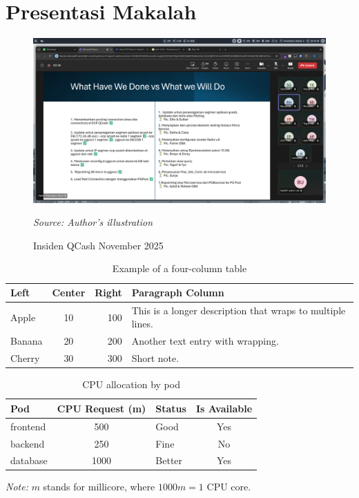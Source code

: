 \chapter*{Presentasi Makalah}

\begin{figure}[h]
  \centering
  \includegraphics[width=1\textwidth]{images/fig1.png}

  \raggedright
  {\footnotesize \textit{Source: Author’s illustration}}%
  \par

  \caption{Insiden QCash November 2025}
  \label{fig:fig1}
\end{figure}

\begin{table}[h]
  \centering
  \caption{Example of a four-column table}
  \label{tab:example}
  \begin{tabular}{ l c r p{4cm} }
    \toprule
    \textbf{Left} & \textbf{Center} & \textbf{Right} & \textbf{Paragraph Column} \\
    \midrule
    Apple  & 10   & 100   & This is a longer description that wraps to multiple lines. \\
    Banana & 20   & 200   & Another text entry with wrapping. \\
    Cherry & 30   & 300   & Short note. \\
    \bottomrule
  \end{tabular}
  \vspace{4pt}
\end{table}

\begin{table}[h]
  \centering
  \caption{CPU allocation by pod}
  \label{tab:cpu}
  \begin{tabular}{l c l c}
    \toprule
    \textbf{Pod} & \textbf{CPU Request (m)} & \textbf{Status} & \textbf{Is Available} \\
    \midrule
    frontend & 500 & Good & Yes \\
    backend  & 250 & Fine & No \\
    database & 1000 & Better & Yes \\
    \bottomrule
  \end{tabular}

  \vspace{4pt}
  {\footnotesize \textit{Note:} $m$ stands for millicore, where $1000m = 1$ CPU core.}
\end{table}
